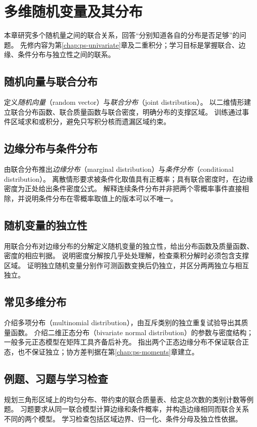 \setcounter{chapter}{3} %
\chapter{多维随机变量及其分布}
\label{chap:ps-multivariate}

本章研究多个随机量之间的联合关系，回答“分别知道各自的分布是否足够”的问题。
先修内容为第\ref{chap:ps-univariate}章及二重积分；学习目标是掌握联合、边缘、条件分布与独立性之间的联系。

\section{随机向量与联合分布}
\label{sec:ps-joint-distributions}
定义\emph{随机向量}（random vector）与\emph{联合分布}（joint distribution）。
以二维情形建立联合分布函数、联合质量函数与联合密度，明确分布的支撑区域。
训练通过事件区域求和或积分，避免只写积分核而遗漏区域约束。

\section{边缘分布与条件分布}
\label{sec:ps-marginal-conditional}
由联合分布推出\emph{边缘分布}（marginal distribution）与\emph{条件分布}（conditional distribution）。
离散情形要求被条件化取值具有正概率；具有联合密度时，在边缘密度为正处给出条件密度公式。
解释连续条件分布并非把两个零概率事件直接相除，并说明条件分布在零概率取值上的版本可以不唯一。

\section{随机变量的独立性}
\label{sec:ps-variable-independence}
用联合分布对边缘分布的分解定义随机变量的独立性，给出分布函数及质量函数、密度的相应判据。
说明密度分解按几乎处处理解，检查乘积分解时必须包含支撑区域。
证明独立随机变量分别作可测函数变换后仍独立，并区分两两独立与相互独立。

\section{常见多维分布}
\label{sec:ps-multivariate-models}
介绍多项分布（multinomial distribution），由互斥类别的独立重复试验导出其质量函数。
介绍二维正态分布（bivariate normal distribution）的参数与密度结构；一般多元正态模型在矩阵工具齐备后补充。
指出两个正态边缘分布不保证联合正态，也不保证独立；协方差判据在第\ref{chap:ps-moments}章建立。

\section{例题、习题与学习检查}
规划三角形区域上的均匀分布、带约束的联合质量表、给定总次数的类别计数等例题。
习题要求从同一联合模型计算边缘和条件概率，并构造边缘相同而联合关系不同的两个模型。
学习检查包括区域边界、归一化、条件分母及独立性依据。






